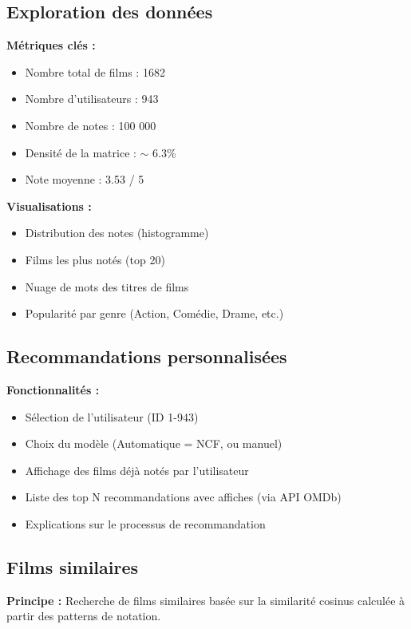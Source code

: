 \documentclass[12pt,a4paper]{article}
\begin{document}
\subsection{Exploration des données}

\textbf{Métriques clés :}
\begin{itemize}
    \item Nombre total de films : 1682
    \item Nombre d'utilisateurs : 943
    \item Nombre de notes : 100 000
    \item Densité de la matrice : $\sim$ 6.3\%
    \item Note moyenne : 3.53 / 5
\end{itemize}

\textbf{Visualisations :}
\begin{itemize}
    \item Distribution des notes (histogramme)
    \item Films les plus notés (top 20)
    \item Nuage de mots des titres de films
    \item Popularité par genre (Action, Comédie, Drame, etc.)
\end{itemize}

\subsection{Recommandations personnalisées}

\textbf{Fonctionnalités :}
\begin{itemize}
    \item Sélection de l'utilisateur (ID 1-943)
    \item Choix du modèle (Automatique = NCF, ou manuel)
    \item Affichage des films déjà notés par l'utilisateur
    \item Liste des top N recommandations avec affiches (via API OMDb)
    \item Explications sur le processus de recommandation
\end{itemize}

\subsection{Films similaires}

\textbf{Principe :} Recherche de films similaires basée sur la similarité cosinus calculée à partir des patterns de notation.
\end{document}
